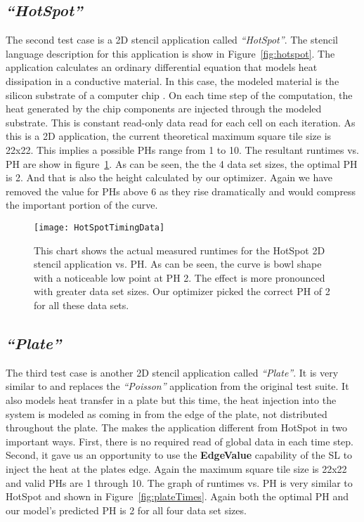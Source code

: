 \documentclass{styles/sig-alternate}
\begin{document}
\subsection{\em ``HotSpot''}
The second test case is a 2D stencil application called {\em ``HotSpot''}.  
The stencil language description for this application is show in Figure~\ref{fig:hotspot}.
The application calculates an ordinary differential equation that models heat dissipation in a conductive material.  
In this case, the modeled material is the silicon substrate of a computer chip \cite{hotspot}.
On each time step of the computation, the heat generated by the chip components are injected through the modeled substrate.  
This is constant read-only data read for each cell on each iteration.  As this is a 2D application, 
the current theoretical maximum square tile size is 22x22.
This implies a possible PHs range from 1 to 10.  The resultant runtimes vs. PH are show in
figure~\ref{fig:hotspotTimes}.  As can be seen, the the 4 data set sizes, the optimal PH is 2.  And that is also the height calculated by
our optimizer.  Again we have removed the value for PHs above 6 as they rise dramatically and would compress the important portion of the curve.

\begin{figure}
\texttt{[image: HotSpotTimingData]}
\caption{This chart shows the actual measured runtimes for the HotSpot 2D stencil application vs. PH.
As can be seen, the curve is bowl shape with a noticeable low point at PH 2.  The effect is more pronounced
with greater data set sizes.  Our optimizer picked the correct PH of 2 for all these data sets.}
\label{fig:hotspotTimes}
\end{figure}

\subsection{\em ``Plate''}
The third test case is another 2D stencil application called {\em ``Plate''}.  It is very similar to and replaces the 
{\em ``Poisson''} application from the original test suite.  It also models heat transfer in a plate but this time, the heat 
injection into the system is modeled as coming in from the edge of the plate, not distributed throughout the plate.  The makes the application
different from HotSpot in two important ways.  First, there is no required read of global data in each time step.  Second, it gave us an opportunity
to use the {\bf EdgeValue} capability of the SL to inject the heat at the plates edge.  Again the maximum square tile size is 22x22 and valid PHs are 1 through 10.  
The graph of runtimes vs. PH is very similar to HotSpot and shown in Figure~\ref{fig:plateTimes}.
Again both the optimal PH and our model's predicted PH is 2 for all four data set sizes.
\end{document}
